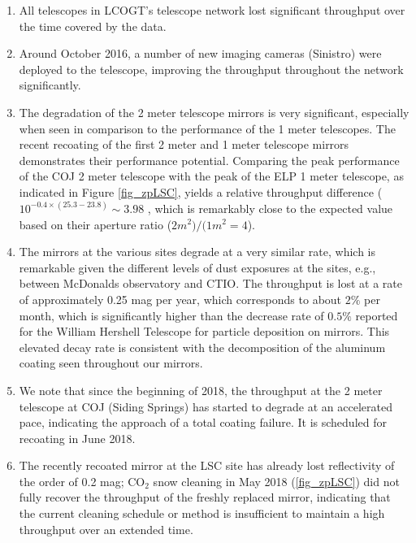 \documentclass[]{spieman}
\begin{document}
\begin{enumerate}
\item All telescopes in LCOGT's telescope network lost significant throughput over the time covered
 by the data. 

\item Around October 2016, a number of new imaging cameras (Sinistro) were deployed to the 
telescope, improving the throughput throughout the network significantly.

\item The degradation of the 2 meter telescope mirrors is very significant, especially when seen in
comparison to the performance of the 1 meter telescopes. The recent recoating of the first 2 meter
and 1 meter telescope mirrors demonstrates their  performance potential. Comparing the peak 
performance of the COJ 2 meter telescope with the peak of the ELP 1 meter telescope, as indicated 
in Figure \ref{fig_zpLSC}, yields a  relative throughput difference  ($10^{-0.4\times (25.3-23.8)} 
\sim 3.98$ , which is remarkably close to the expected value based on their aperture ratio 
($2m^2)/(1m^2 = 4$).

\item The mirrors at the various sites degrade at a very similar rate, which is remarkable given the
different levels of dust exposures at the sites, e.g., between McDonalds observatory and CTIO. The
throughput is lost at a rate of approximately 0.25 mag per year, which corresponds to about $2 \%$
per month, which is significantly higher than the decrease rate of $0.5\%$ reported for the 
William Hershell Telescope\cite{designolt,benn2000} for particle deposition on mirrors. This elevated 
decay rate is  consistent with the decomposition of the aluminum coating seen throughout our mirrors.

\item We note that since the beginning of 2018, the throughput at the 2 meter telescope at COJ 
(Siding Springs) has started to degrade at an accelerated pace, indicating the approach of a total 
coating failure. It is scheduled for recoating in June 2018.

\item The recently recoated mirror at the LSC site has already lost reflectivity of the order of 0.2
mag; CO$_2$ snow cleaning in May 2018 (\ref{fig_zpLSC}) did not fully recover the throughput of the
freshly replaced mirror,  indicating that the current cleaning schedule or method is insufficient
to maintain a high throughput over an extended time.
\end{enumerate}
\end{document}
